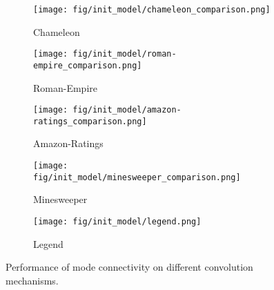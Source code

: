 \begin{figure*}[!ht]
    \begin{subfigure}[b]{0.24\textwidth}
        \texttt{[image: fig/init\_model/chameleon\_comparison.png]}
        \caption{Chameleon}
    \end{subfigure}
    \begin{subfigure}[b]{0.24\textwidth}
        \texttt{[image: fig/init\_model/roman-empire\_comparison.png]}
        \caption{Roman-Empire}
    \end{subfigure}
    \begin{subfigure}[b]{0.24\textwidth}
        \texttt{[image: fig/init\_model/amazon-ratings\_comparison.png]}
        \caption{Amazon-Ratings }
    \end{subfigure}
        \begin{subfigure}[b]{0.24\textwidth}
        \texttt{[image: fig/init\_model/minesweeper\_comparison.png]}
        \caption{Minesweeper}
    \end{subfigure}
            \begin{subfigure}[b]{0.24\textwidth}
        \texttt{[image: fig/init\_model/legend.png]}
        \caption{Legend}
    \end{subfigure}
    \caption{Performance of mode connectivity on different convolution mechanisms.}
    \label{fig:A3}
\end{figure*}

\clearpage
